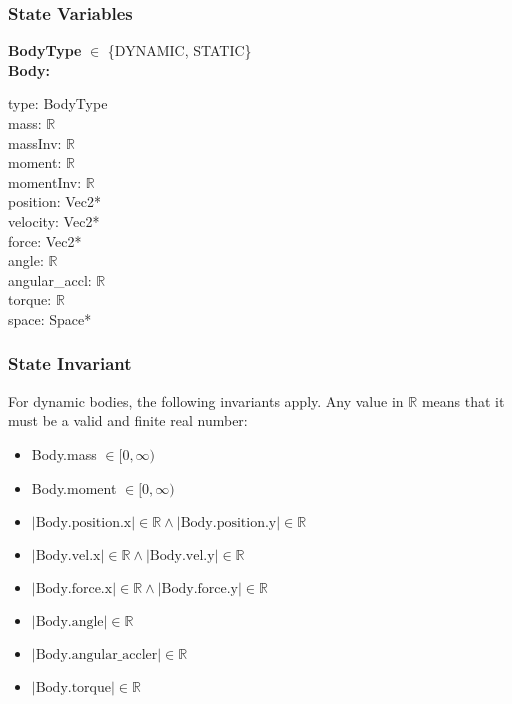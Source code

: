 \documentclass[12pt]{article}
\newcommand{\R}{$\mathbb{R}$}
\begin{document}
\subsubsection{State Variables} \label{SecSVBody}
	\textbf{BodyType} $\in$ \{DYNAMIC, STATIC\} \\ 
	\newline
	\textbf{Body:} 
	 \begin{multicols}{3}
		\noindent type: BodyType \\
		mass: \R \\
		massInv: \R \\
		moment: \R \\
		momentInv: \R \\
		position: Vec2* \\
		velocity: Vec2* \\
		force: Vec2* \\
		angle: \R \\
		angular_accl: \R \\
		torque: \R \\
		space: Space* \\
	\end{multicols}

        \subsubsection{State Invariant} \label{SecSIBody} For dynamic bodies,
        the following invariants apply. Any value in $\mathbb{R}$ means that it
        must be a valid and finite real number:
	\begin{itemize}
	\item Body.mass $\in [0, \infty)$ 
	\item Body.moment $\in [0, \infty)$ 
	\item $|\text{Body.position.x}| \in \mathbb{R} \wedge |\text{Body.position.y}| \in \mathbb{R}$ 
	\item $|\text{Body.vel.x}| \in \mathbb{R} \wedge |\text{Body.vel.y}| \in \mathbb{R}$ 	
	\item $|\text{Body.force.x}| \in \mathbb{R} \wedge |\text{Body.force.y}| \in \mathbb{R}$ 
	\item $|\text{Body.angle}| \in \mathbb{R}$  
	\item $|\text{Body.angular_accler}| \in \mathbb{R}$  
	\item $|\text{Body.torque}| \in \mathbb{R}$
	\end{itemize}
\end{document}
